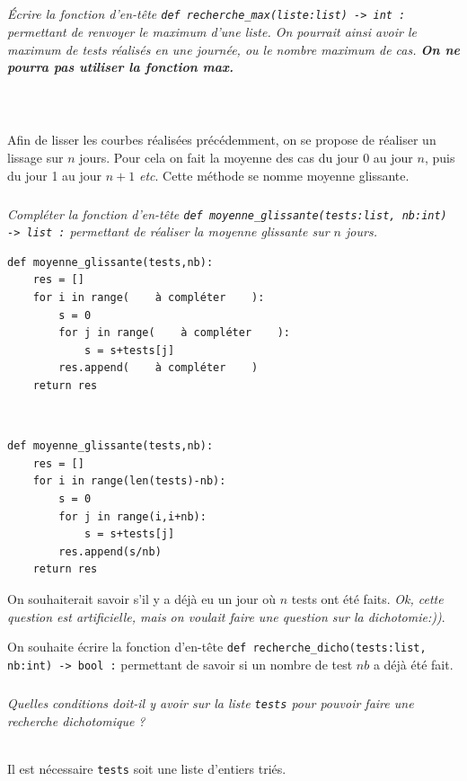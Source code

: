 \documentclass[10pt,fleqn]{article} %
\begin{document}
\subparagraph{}
\textit{Écrire la fonction d’en-tête \texttt{def recherche\_max(liste:list) -> int :} permettant de renvoyer le maximum d'une liste. On pourrait ainsi avoir le maximum de tests réalisés en une journée, ou le nombre maximum de cas. \textbf{On ne pourra pas utiliser la fonction max.}}
\ifprof
\begin{corrige}~\\
\begin{lstlisting}

\end{lstlisting}
\end{corrige}
\else
\fi

\ifprof
Afin de lisser les courbes réalisées précédemment, on se propose de réaliser un lissage sur $n$ jours. Pour cela on fait la moyenne des cas du jour 0 au jour $n$, puis du jour 1 au jour $n+1$ \textit{etc}. Cette méthode se nomme moyenne glissante. 
\else
\fi

\subparagraph{}
\textit{Compléter la fonction d’en-tête \texttt{def moyenne\_glissante(tests:list, nb:int) -> list :} permettant de réaliser la moyenne glissante sur $n$ jours. }
\ifprof
\else
\begin{lstlisting}
def moyenne_glissante(tests,nb):
    res = []
    for i in range(    à compléter    ):
        s = 0
        for j in range(    à compléter    ):
            s = s+tests[j]
        res.append(    à compléter    )
    return res
\end{lstlisting}
\fi

\ifprof
\begin{corrige}~\\
\begin{lstlisting}
def moyenne_glissante(tests,nb):
    res = []
    for i in range(len(tests)-nb):
        s = 0
        for j in range(i,i+nb):
            s = s+tests[j]
        res.append(s/nb)
    return res
\end{lstlisting}
\end{corrige}
\else
\fi

\ifprof
\else
On souhaiterait savoir s'il y a déjà eu un jour où $n$ tests ont été faits. \textit{Ok, cette question est artificielle, mais on voulait faire une question sur la dichotomie:))}.

On souhaite écrire la fonction d’en-tête \texttt{def recherche\_dicho(tests:list, nb:int) -> bool :} permettant de savoir si un nombre de test $nb$ a déjà été fait. 
\fi

\subparagraph{}
\textit{Quelles conditions doit-il y avoir sur la liste \texttt{tests} pour pouvoir faire une recherche dichotomique ?}
\ifprof
\begin{corrige}~\\
Il est nécessaire  \texttt{tests} soit une liste d'entiers triés.
\end{corrige}
\else
\fi
\end{document}

